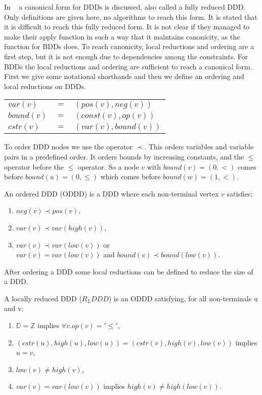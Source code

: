 In ~\cite{ddds} a canonical form for DDDs is discussed, also called a fully reduced DDD. Only definitions are given here, no algorithms to reach this form. It is stated that it is difficult to reach this fully reduced form. It is not clear if they managed to make their apply function in such a way that it maintains canonicity, as the function for BDDs does. To reach canonicity, local reductions and ordering are a first step, but it is not enough due to dependencies among the constraints. For BDDs the local reductions and ordering are sufficient to reach a canonical form. First we give some notational shorthands and then we define an ordering and local reductions on DDDs.
%
\begin{center}
\begin{tabular}{lll}
$var(v)$   & $=$ & $(pos(v),neg(v))$   \\
$bound(v)$ & $=$ & $(const(v),op(v))$  \\
$cstr(v)$  & $=$ & $(var(v),bound(v))$
\end{tabular}
\end{center}

To order DDD nodes we use the operator $\prec$. This orders variables and variable pairs in a predefined order. It orders bounds by increasing constants, and the $\le$ operator before the $\leq$ operator. So a node $v$ with $bound(v) = (0,<)$ comes before $bound(u) = (0,\leq)$ which comes before $bound(w) = (1,<)$.

\begin{mydef}
\label{def:ODDD}
An ordered DDD (ODDD) is a DDD where each non-terminal vertex $v$ satisfies:
\begin{enumerate}
  \item $neg(v) \prec pos(v)$,
  \item $var(v) \prec var(high(v))$,
  \item $var(v) \prec var(low(v))$ or \\ $var(v) = var(low(v))$ and $bound(v) \prec bound(low(v))$.
\end{enumerate}
\end{mydef}

After ordering a DDD some local reductions can be defined to reduce the size of a DDD.

\begin{mydef}
\label{def:RLDDD}
A locally reduced DDD ($R_LDDD$) is an ODDD satisfying, for all non-terminals u and v:
\begin{enumerate}
  \item $\mathbb{D} = \mathbb{Z}$ implies $\forall v. op(v) = '\leq'$,
  \item $(cstr(u),high(u),low(u)) = (cstr(v),high(v),low(v))$ implies $u = v$,
  \item $low(v) \neq high(v)$,
  \item $var(v) = var(low(v))$ implies $high(v) \neq high(low(v))$.
\end{enumerate}
\end{mydef}

